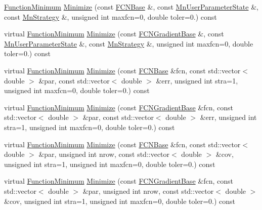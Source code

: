 \begin{DoxyCompactItemize}
\item 
\mbox{\hyperlink{classROOT_1_1Minuit2_1_1FunctionMinimum}{Function\+Minimum}} \mbox{\hyperlink{classROOT_1_1Minuit2_1_1FumiliMinimizer_a3da0ec7b2ba7f876809f72d2f3054eec}{Minimize}} (const \mbox{\hyperlink{classROOT_1_1Minuit2_1_1FCNBase}{F\+C\+N\+Base}} \&, const \mbox{\hyperlink{classROOT_1_1Minuit2_1_1MnUserParameterState}{Mn\+User\+Parameter\+State}} \&, const \mbox{\hyperlink{classROOT_1_1Minuit2_1_1MnStrategy}{Mn\+Strategy}} \&, unsigned int maxfcn=0, double toler=0.) const
\item 
virtual \mbox{\hyperlink{classROOT_1_1Minuit2_1_1FunctionMinimum}{Function\+Minimum}} \mbox{\hyperlink{classROOT_1_1Minuit2_1_1FumiliMinimizer_a2bffd3a7c3090b841f8c23248b83b16e}{Minimize}} (const \mbox{\hyperlink{classROOT_1_1Minuit2_1_1FCNGradientBase}{F\+C\+N\+Gradient\+Base}} \&, const \mbox{\hyperlink{classROOT_1_1Minuit2_1_1MnUserParameterState}{Mn\+User\+Parameter\+State}} \&, const \mbox{\hyperlink{classROOT_1_1Minuit2_1_1MnStrategy}{Mn\+Strategy}} \&, unsigned int maxfcn=0, double toler=0.) const
\item 
virtual \mbox{\hyperlink{classROOT_1_1Minuit2_1_1FunctionMinimum}{Function\+Minimum}} \mbox{\hyperlink{classROOT_1_1Minuit2_1_1FumiliMinimizer_ab9ec6dd4a0e664db7d23a3ea3b0a3c75}{Minimize}} (const \mbox{\hyperlink{classROOT_1_1Minuit2_1_1FCNBase}{F\+C\+N\+Base}} \&fcn, const std\+::vector$<$ double $>$ \&par, const std\+::vector$<$ double $>$ \&err, unsigned int stra=1, unsigned int maxfcn=0, double toler=0.) const
\item 
virtual \mbox{\hyperlink{classROOT_1_1Minuit2_1_1FunctionMinimum}{Function\+Minimum}} \mbox{\hyperlink{classROOT_1_1Minuit2_1_1FumiliMinimizer_a2bb7832765e33c24ffad4636ad3b7193}{Minimize}} (const \mbox{\hyperlink{classROOT_1_1Minuit2_1_1FCNGradientBase}{F\+C\+N\+Gradient\+Base}} \&fcn, const std\+::vector$<$ double $>$ \&par, const std\+::vector$<$ double $>$ \&err, unsigned int stra=1, unsigned int maxfcn=0, double toler=0.) const
\item 
virtual \mbox{\hyperlink{classROOT_1_1Minuit2_1_1FunctionMinimum}{Function\+Minimum}} \mbox{\hyperlink{classROOT_1_1Minuit2_1_1FumiliMinimizer_ac2cff69bc8ac1702179b9e17288095a8}{Minimize}} (const \mbox{\hyperlink{classROOT_1_1Minuit2_1_1FCNBase}{F\+C\+N\+Base}} \&fcn, const std\+::vector$<$ double $>$ \&par, unsigned int nrow, const std\+::vector$<$ double $>$ \&cov, unsigned int stra=1, unsigned int maxfcn=0, double toler=0.) const
\item 
virtual \mbox{\hyperlink{classROOT_1_1Minuit2_1_1FunctionMinimum}{Function\+Minimum}} \mbox{\hyperlink{classROOT_1_1Minuit2_1_1FumiliMinimizer_aa17be65e26311aa25f6fd3680f747958}{Minimize}} (const \mbox{\hyperlink{classROOT_1_1Minuit2_1_1FCNGradientBase}{F\+C\+N\+Gradient\+Base}} \&fcn, const std\+::vector$<$ double $>$ \&par, unsigned int nrow, const std\+::vector$<$ double $>$ \&cov, unsigned int stra=1, unsigned int maxfcn=0, double toler=0.) const

\end{DoxyCompactItemize}

